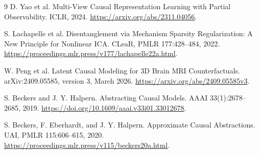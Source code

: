 \documentclass[10pt,twocolumn,letterpaper]{article}
\begin{document}
\begin{thebibliography}{9}
D. Yao et al.
\newblock Multi-View Causal Representation Learning with Partial Observability.
\newblock ICLR, 2024.
\newblock \url{https://arxiv.org/abs/2311.04056}.

S. Lachapelle et al.
\newblock Disentanglement via Mechanism Sparsity Regularization: A New Principle for Nonlinear ICA.
\newblock CLeaR, PMLR 177:428--484, 2022.
\newblock \url{https://proceedings.mlr.press/v177/lachapelle22a.html}.

W. Peng et al.
\newblock Latent Causal Modeling for 3D Brain MRI Counterfactuals.
\newblock arXiv:2409.05585, version 3, March 2026.
\newblock \url{https://arxiv.org/abs/2409.05585v3}.

S. Beckers and J. Y. Halpern.
\newblock Abstracting Causal Models.
\newblock AAAI 33(1):2678--2685, 2019.
\newblock \url{https://doi.org/10.1609/aaai.v33i01.33012678}.

S. Beckers, F. Eberhardt, and J. Y. Halpern.
\newblock Approximate Causal Abstractions.
\newblock UAI, PMLR 115:606--615, 2020.
\newblock \url{https://proceedings.mlr.press/v115/beckers20a.html}.
\end{thebibliography}
\end{document}
